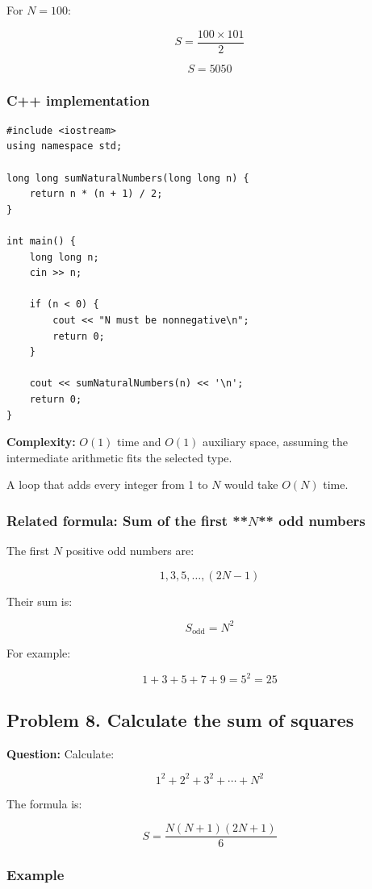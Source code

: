 For $N=100$:


\[
S=\frac{100\times101}{2}
\]



\[
\boxed{S=5050}
\]


\subsubsection{C++ implementation}

\begin{lstlisting}[style=cppstyle]
#include <iostream>
using namespace std;

long long sumNaturalNumbers(long long n) {
    return n * (n + 1) / 2;
}

int main() {
    long long n;
    cin >> n;

    if (n < 0) {
        cout << "N must be nonnegative\n";
        return 0;
    }

    cout << sumNaturalNumbers(n) << '\n';
    return 0;
}
\end{lstlisting}

\textbf{Complexity:} $O(1)$ time and $O(1)$ auxiliary space, assuming the intermediate arithmetic fits the selected type.

A loop that adds every integer from 1 to $N$ would take $O(N)$ time.

\subsubsection{Related formula: Sum of the first **$N$** odd numbers}

The first $N$ positive odd numbers are:


\[
1,3,5,\ldots,(2N-1)
\]


Their sum is:


\[
\boxed{S_{\text{odd}}=N^2}
\]


For example:


\[
1+3+5+7+9=5^2=\boxed{25}
\]


\subsection{Problem 8. Calculate the sum of squares}

\textbf{Question:} Calculate:


\[
1^2+2^2+3^2+\cdots+N^2
\]


The formula is:


\[
\boxed{S=\frac{N(N+1)(2N+1)}6}
\]


\subsubsection{Example}

